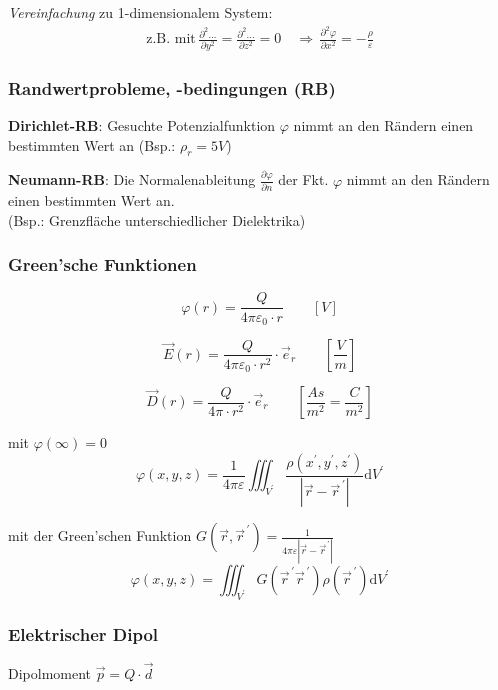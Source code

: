 \textit{Vereinfachung} zu 1-dimensionalem System:
\begin{align*}
	\text{z.B. mit}\, \frac{\partial^2...}{\partial y^2} = \frac{\partial^2...}{\partial z^2} = 0 \quad \Rightarrow \, \frac{\partial^2 \varphi}{\partial x^2} = -\frac{\rho}{\varepsilon}
\end{align*}

\subsubsection{Randwertprobleme, -bedingungen (RB)}
\textbf{Dirichlet-RB}: Gesuchte Potenzialfunktion $ \varphi $ nimmt an den
Rändern einen bestimmten Wert an (Bsp.: $\rho_r = 5V$)

\textbf{Neumann-RB}: Die Normalenableitung $ \tfrac{\partial\varphi}{\partial
		n} $ der Fkt. $ \varphi $ nimmt an den Rändern einen bestimmten Wert an. \\
(Bsp.: Grenzfläche unterschiedlicher Dielektrika)

\subsubsection{Green'sche Funktionen}
\[ \varphi (r) = \dfrac{Q}{4 \pi \varepsilon_0 \cdot r} \qquad\left[V\right] \]

\[ \vec{E}(r) = \dfrac{Q}{4 \pi \varepsilon_0 \cdot r^2}\cdot\vec{e}_r \qquad\left[\frac{V}{m}\right] \]

\[ \vec{D}(r) = \dfrac{Q}{4 \pi \cdot r^2}\cdot\vec{e}_r \qquad\left[\frac{As}{m^2}=\frac{C}{m^2}\right] \]


mit $\varphi(\infty)=0$
\[
	\varphi(x, y, z)=\frac{1}{4 \pi \varepsilon} \iiint_{V^{\prime}}
	\frac{\rho\left(x^{\prime}, y^{\prime},
		z^{\prime}\right)}{\left|\vec{r}-\vec{r}^{\,\prime}\right|} \mathrm{d}
	V^{\prime}
\]

mit der Green'schen Funktion $G\left(\vec{r},
	\vec{r}^{\,\prime}\right)=\frac{1}{4 \pi
		\varepsilon\left|\vec{r}-\vec{r}^{\,\prime}\right|}$
\[ \varphi(x, y, z)=\iiint_{V^{\prime}} G\left(\vec{r}^{\,\prime} \vec{r}^{\,\prime}\right) \rho\left(\vec{r}^{\,\prime}\right) \mathrm{d} V^{\prime} \]

\subsubsection{Elektrischer Dipol}
Dipolmoment $\vec{p} = Q\cdot\vec{d}$

